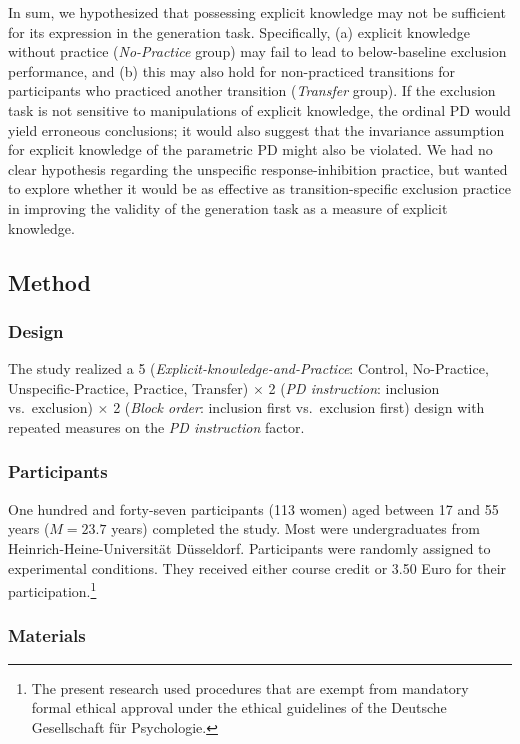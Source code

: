 \documentclass[man]{apa6}
\theoremstyle{definition}
\theoremstyle{definition}
\theoremstyle{definition}
\theoremstyle{remark}
\begin{document}
In sum, we hypothesized that possessing explicit knowledge may not be
sufficient for its expression in the generation task. Specifically, (a)
explicit knowledge without practice (\emph{No-Practice} group) may fail
to lead to below-baseline exclusion performance, and (b) this may also
hold for non-practiced transitions for participants who practiced
another transition (\emph{Transfer} group). If the exclusion task is not
sensitive to manipulations of explicit knowledge, the ordinal PD would
yield erroneous conclusions; it would also suggest that the invariance
assumption for explicit knowledge of the parametric PD might also be
violated. We had no clear hypothesis regarding the unspecific
response-inhibition practice, but wanted to explore whether it would be
as effective as transition-specific exclusion practice in improving the
validity of the generation task as a measure of explicit knowledge.

\subsection{Method}\label{method}

\subsubsection{Design}\label{design}

The study realized a 5 (\emph{Explicit-knowledge-and-Practice}: Control,
No-Practice, Unspecific-Practice, Practice, Transfer) \(\times\) 2
(\emph{PD instruction}: inclusion vs.~exclusion) \(\times\) 2
(\emph{Block order}: inclusion first vs.~exclusion first) design with
repeated measures on the \emph{PD instruction} factor.

\subsubsection{Participants}\label{participants}

One hundred and forty-seven participants (113 women) aged between 17 and
55 years (\(M = 23.7\) years) completed the study. Most were
undergraduates from Heinrich-Heine-Universität Düsseldorf. Participants
were randomly assigned to experimental conditions. They received either
course credit or 3.50 Euro for their participation.\footnote{The present
  research used procedures that are exempt from mandatory formal ethical
  approval under the ethical guidelines of the Deutsche Gesellschaft für
  Psychologie.}

\subsubsection{Materials}\label{materials}
\end{document}
